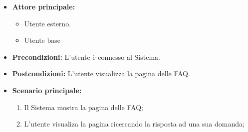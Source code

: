 \label{usecase:Visualizzazione FAQ}
\begin{itemize}
	\item \textbf{Attore principale:} 
    \begin{itemize}
        \item Utente esterno.
        \item Utente base
    \end{itemize}

	\item \textbf{Precondizioni:}
	      L'utente è connesso al Sistema.

	\item \textbf{Postcondizioni:} L'utente visualizza la pagina delle FAQ.

	\item \textbf{Scenario principale:}
	      \begin{enumerate}
              \item Il Sistema mostra la pagina delle FAQ;
              \item L'utente visualiza la pagina ricercando la risposta ad una sua domanda;
		    
	      \end{enumerate}
\end{itemize}